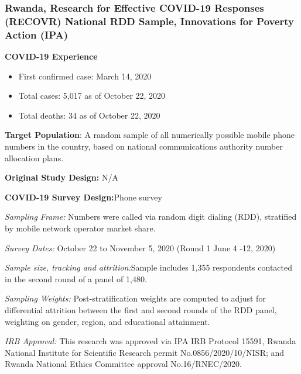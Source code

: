 \documentclass[
  12pt,
]{article}
\begin{document}
\hypertarget{rwanda-research-for-effective-covid-19-responses-recovr-national-rdd-sample-innovations-for-poverty-action-ipa}{%
\subsubsection*{Rwanda, Research for Effective COVID-19 Responses (RECOVR) National RDD Sample, Innovations for Poverty Action (IPA)}\label{rwanda-research-for-effective-covid-19-responses-recovr-national-rdd-sample-innovations-for-poverty-action-ipa}}

\textbf{COVID-19 Experience}

\begin{itemize}
 \item First confirmed case: March 14, 2020
 \item Total cases:  5,017 as of October 22, 2020 
\item Total deaths:  34 as of October 22, 2020 
\end{itemize}

\textbf{Target Population}: A random sample of all numerically possible mobile phone numbers in the country, based on national communications authority number allocation plans.

\textbf{Original Study Design:} N/A

\textbf{COVID-19 Survey Design:}Phone survey

\emph{Sampling Frame:} Numbers were called via random digit dialing (RDD), stratified by mobile network operator market share.

\emph{Survey Dates:} October 22 to November 5, 2020 (Round 1 June 4 -12, 2020)

\emph{Sample size, tracking and attrition:}Sample includes 1,355 respondents contacted in the second round of a panel of 1,480.

\emph{Sampling Weights:} Post-stratification weights are computed to adjust for differential attrition between the first and second rounds of the RDD panel, weighting on gender, region, and educational attainment.

\emph{IRB Approval:} This research was approved via IPA IRB Protocol 15591, Rwanda National Institute for Scientific Research permit No.0856/2020/10/NISR; and Rwanda National Ethics Committee approval No.16/RNEC/2020.
\end{document}
